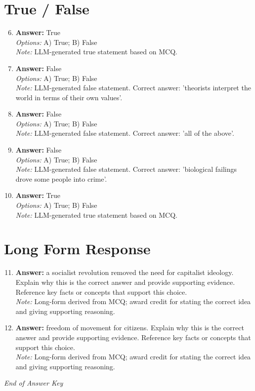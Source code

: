 \documentclass[12pt]{article}
\begin{document}
\section*{True / False}
\begin{enumerate}[label=\arabic*.]
\setcounter{enumi}{5}
\item \textbf{Answer:} True
\\ \textit{Options:} A) True; B) False
\\ \textit{Note:} LLM-generated true statement based on MCQ.
\item \textbf{Answer:} False
\\ \textit{Options:} A) True; B) False
\\ \textit{Note:} LLM-generated false statement. Correct answer: 'theorists interpret the world in terms of their own values'.
\item \textbf{Answer:} False
\\ \textit{Options:} A) True; B) False
\\ \textit{Note:} LLM-generated false statement. Correct answer: 'all of the above'.
\item \textbf{Answer:} False
\\ \textit{Options:} A) True; B) False
\\ \textit{Note:} LLM-generated false statement. Correct answer: 'biological failings drove some people into crime'.
\item \textbf{Answer:} True
\\ \textit{Options:} A) True; B) False
\\ \textit{Note:} LLM-generated true statement based on MCQ.
\end{enumerate}

\section*{Long Form Response}
\begin{enumerate}[label=\arabic*.]
\setcounter{enumi}{10}
\item \textbf{Answer:} a socialist revolution removed the need for capitalist ideology. Explain why this is the correct answer and provide supporting evidence. Reference key facts or concepts that support this choice.
\\ \textit{Note:} Long-form derived from MCQ; award credit for stating the correct idea and giving supporting reasoning.
\item \textbf{Answer:} freedom of movement for citizens. Explain why this is the correct answer and provide supporting evidence. Reference key facts or concepts that support this choice.
\\ \textit{Note:} Long-form derived from MCQ; award credit for stating the correct idea and giving supporting reasoning.
\end{enumerate}

\vfill
\noindent\textit{End of Answer Key}
\end{document}
